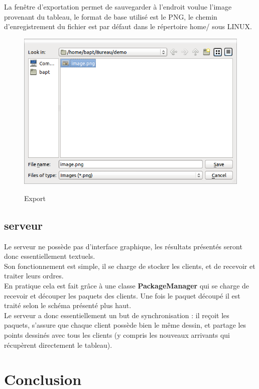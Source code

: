 \documentclass{report}
\begin{document}
				La fenêtre d'exportation permet de sauvegarder à l'endroit voulue l'image provenant du tableau, le format de base utilisé est le PNG, le chemin d'enregistrement du fichier est par défaut dans le répertoire home/ sous LINUX. \\
				\begin{figure}[!h]
						\centering
						\includegraphics[scale=0.4]{../images/export.png}\\
						\caption{Export}
						\label{Export}
				\end{figure}
				\newpage
		\section{serveur}
		Le serveur ne possède pas d'interface graphique, les résultats présentés seront donc essentiellement textuels. \\
		Son fonctionnement est simple, il se charge de stocker les clients, et de recevoir et traiter leurs ordres.\\
		En pratique cela est fait grâce à une classe \textbf{PackageManager} qui se charge de recevoir et découper les paquets des clients. Une fois le paquet découpé il est traité selon le schéma présenté plus haut. \\
		Le serveur a donc essentiellement un but de synchronisation : il reçoit les paquets, s'assure que chaque client possède bien le même dessin, et partage les points dessinés avec tous les clients (y compris les nouveaux arrivants qui récupèrent directement le tableau). \\
	
	\chapter{Conclusion}
\end{document}
